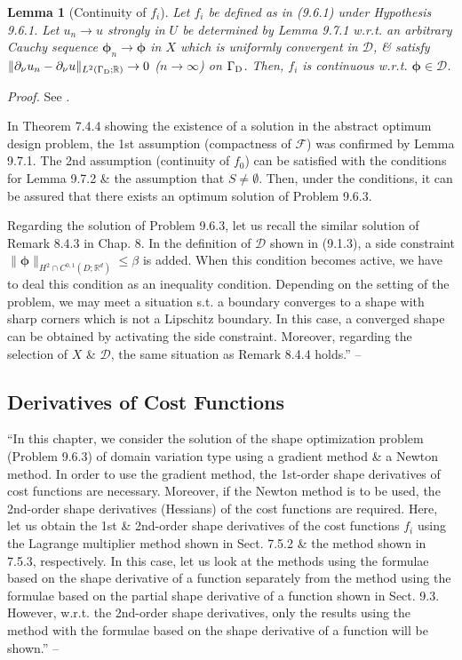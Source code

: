 \documentclass[oneside]{book}
\numberwithin{equation}{section}
\newtheorem{lemma}{Lemma}[chapter]
\begin{document}
\begin{lemma}[Continuity of $f_i$]
	Let $f_i$ be defined as in (9.6.1) under Hypothesis 9.6.1. Let $u_n\to u$ strongly in $U$ be determined by Lemma 9.7.1 w.r.t. an arbitrary Cauchy sequence $\boldsymbol{\phi}_n\to\boldsymbol{\phi}$ in $X$ which is uniformly convergent in $\mathcal{D}$, \& satisfy $\|\partial_\nu u_n - \partial_\nu u\|_{L^2(\Gamma_{\rm D};\mathbb{R})}\to 0$ ($n\to\infty$) on $\Gamma_{\rm D}$. Then, $f_i$ is continuous w.r.t. $\boldsymbol{\phi}\in\mathcal{D}$.
\end{lemma}
\textit{Proof.} See \cite[pp. 474--476]{Azegami2020}.

In Theorem 7.4.4 showing the existence of a solution in the abstract optimum design problem, the 1st assumption (compactness of $\mathcal{F}$) was confirmed by Lemma 9.7.1. The 2nd assumption (continuity of $f_0$) can be satisfied with the conditions for Lemma 9.7.2 \& the assumption that $S\ne\emptyset$. Then, under the conditions, it can be assured that there exists an optimum solution of Problem 9.6.3.

Regarding the solution of Problem 9.6.3, let us recall the similar solution of Remark 8.4.3 in Chap. 8. In the definition of $\mathcal{D}$ shown in (9.1.3), a side constraint $\|\boldsymbol{\phi}\|_{H^2\cap C^{0,1}(D;\mathbb{R}^d)}\le\beta$ is added. When this condition becomes active, we have to deal this condition as an inequality condition. Depending on the setting of the problem, we may meet a situation s.t. a boundary converges to a shape with sharp corners which is not a Lipschitz boundary. In this case, a converged shape can be obtained by activating the side constraint. Moreover, regarding the selection of $X$ \& $\mathcal{D}$, the same situation as Remark 8.4.4 holds.'' -- \cite[pp. 470--477]{Azegami2020}

\subsection{Derivatives of Cost Functions}
``In this chapter, we consider the solution of the shape optimization problem (Problem 9.6.3) of domain variation type using a gradient method \& a Newton method. In order to use the gradient method, the 1st-order shape derivatives of cost functions are necessary. Moreover, if the Newton method is to be used, the 2nd-order shape derivatives (Hessians) of the cost functions are required. Here, let us obtain the 1st \& 2nd-order shape derivatives of the cost functions $f_i$ using the Lagrange multiplier method shown in Sect. 7.5.2 \& the method shown in 7.5.3, respectively. In this case, let us look at the methods using the formulae based on the shape derivative of a function separately from the method using the formulae based on the partial shape derivative of a function shown in Sect. 9.3. However, w.r.t. the 2nd-order shape derivatives, only the results using the method with the formulae based on the shape derivative of a function will be shown.'' -- \cite[p. 477]{Azegami2020}
\end{document}

